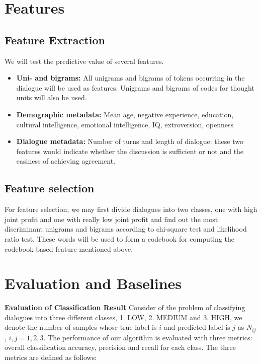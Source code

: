 \documentclass[11pt]{article} %
\begin{document}
\section{Features}
\subsection{Feature Extraction}  %
We will test the predictive value of several features.

\begin{itemize}
\item \textbf{Uni- and bigrams:} All unigrams and bigrams of tokens occurring in the dialogue will be used as features.  Unigrams and bigrams of codes for thought units will also be used.

\item \textbf{Demographic metadata:} Mean age, negative experience, education, cultural intelligence, emotional intelligence, IQ, extroversion, openness

\item \textbf{Dialogue metadata:} Number of turns and length of dialogue: these two features would indicate whether the discussion is sufficient or not and the easiness of achieving agreement.
\end{itemize}

\subsection{Feature selection}  %
For feature selection, we may first divide dialogues into two classes, one with high joint profit and one with really low joint profit and find out the most discriminant unigrams and bigrams according to chi-square test and likelihood ratio test. These words will be used to form a codebook for computing the codebook based feature mentioned above.

\section{Evaluation and Baselines} %
\textbf{Evaluation of Classification Result}
Consider of the problem of classifying dialogues into three different classes, 1. LOW, 2. MEDIUM and 3. HIGH, we denote the number of samples whose true label is $i$ and predicted label is $j$ as $N_{ij}$, $i,j=1,2,3$. The performance of our algorithm is evaluated with three metrics: overall classification accuracy, precision and recall for each class. The three metrics are defined as follows:
\end{document}

